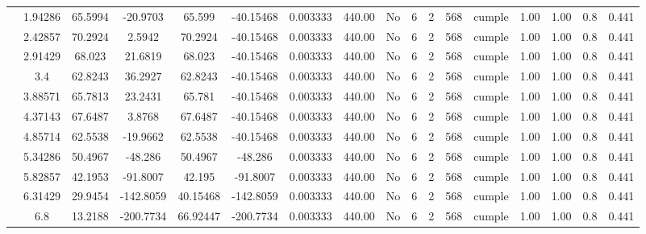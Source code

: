 \begin{table}[H]
{\begin{tabular}{|c|c|c|c|c|c|c|c|c|c|c|c|c|c|c|c|c|}
\cline{2-17}        & 1.94286 & 65.5994 & -20.9703 & 65.599 & -40.15468 & 0.003333 & 440.00 & No  & 6   & 2   & 568 & \cellcolor[rgb]{ .776,  .937,  .808}cumple & 1.00 & 1.00 & 0.8 & 0.441 \bigstrut\\
\cline{2-17}        & 2.42857 & 70.2924 & 2.5942 & 70.2924 & -40.15468 & 0.003333 & 440.00 & No  & 6   & 2   & 568 & \cellcolor[rgb]{ .776,  .937,  .808}cumple & 1.00 & 1.00 & 0.8 & 0.441 \bigstrut\\
\cline{2-17}        & 2.91429 & 68.023 & 21.6819 & 68.023 & -40.15468 & 0.003333 & 440.00 & No  & 6   & 2   & 568 & \cellcolor[rgb]{ .776,  .937,  .808}cumple & 1.00 & 1.00 & 0.8 & 0.441 \bigstrut\\
\cline{2-17}        & 3.4 & 62.8243 & 36.2927 & 62.8243 & -40.15468 & 0.003333 & 440.00 & No  & 6   & 2   & 568 & \cellcolor[rgb]{ .776,  .937,  .808}cumple & 1.00 & 1.00 & 0.8 & 0.441 \bigstrut\\
\cline{2-17}        & 3.88571 & 65.7813 & 23.2431 & 65.781 & -40.15468 & 0.003333 & 440.00 & No  & 6   & 2   & 568 & \cellcolor[rgb]{ .776,  .937,  .808}cumple & 1.00 & 1.00 & 0.8 & 0.441 \bigstrut\\
\cline{2-17}        & 4.37143 & 67.6487 & 3.8768 & 67.6487 & -40.15468 & 0.003333 & 440.00 & No  & 6   & 2   & 568 & \cellcolor[rgb]{ .776,  .937,  .808}cumple & 1.00 & 1.00 & 0.8 & 0.441 \bigstrut\\
\cline{2-17}        & 4.85714 & 62.5538 & -19.9662 & 62.5538 & -40.15468 & 0.003333 & 440.00 & No  & 6   & 2   & 568 & \cellcolor[rgb]{ .776,  .937,  .808}cumple & 1.00 & 1.00 & 0.8 & 0.441 \bigstrut\\
\cline{2-17}        & 5.34286 & 50.4967 & -48.286 & 50.4967 & -48.286 & 0.003333 & 440.00 & No  & 6   & 2   & 568 & \cellcolor[rgb]{ .776,  .937,  .808}cumple & 1.00 & 1.00 & 0.8 & 0.441 \bigstrut\\
\cline{2-17}        & 5.82857 & 42.1953 & -91.8007 & 42.195 & -91.8007 & 0.003333 & 440.00 & No  & 6   & 2   & 568 & \cellcolor[rgb]{ .776,  .937,  .808}cumple & 1.00 & 1.00 & 0.8 & 0.441 \bigstrut\\
\cline{2-17}        & 6.31429 & 29.9454 & -142.8059 & 40.15468 & -142.8059 & 0.003333 & 440.00 & No  & 6   & 2   & 568 & \cellcolor[rgb]{ .776,  .937,  .808}cumple & 1.00 & 1.00 & 0.8 & 0.441 \bigstrut\\
\cline{2-17}        & \cellcolor[rgb]{ .851,  .882,  .949}6.8 & 13.2188 & -200.7734 & 66.92447 & -200.7734 & 0.003333 & 440.00 & No  & 6   & 2   & 568 & \cellcolor[rgb]{ .776,  .937,  .808}cumple & 1.00 & 1.00 & 0.8 & 0.441 \bigstrut\\

\end{tabular}}
\end{table}

